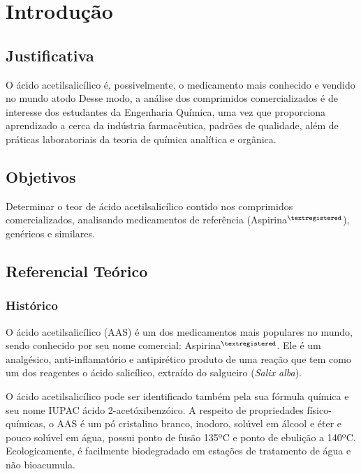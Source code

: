     \chapter{Introdução}\label{intro}
    \section{Justificativa}\label{sub:just}    

    O ácido acetilsalicílico é, possivelmente, o medicamento mais conhecido e vendido no mundo atodo
    Desse modo, a análise dos comprimidos comercializados é de interesse dos estudantes da Engenharia Química,
    uma vez que proporciona aprendizado a cerca da indústria farmacêutica, padrões de qualidade, além de
    práticas laboratoriais da teoria de química analítica e orgânica.

    \section{Objetivos}\label{sub:Objetivos}
    Determinar o teor de ácido acetilsalicílico contido nos comprimidos comercializados, analisando
    medicamentos de referência (Aspirina$^{\tiny{\textregistered}}$), genéricos e similares.

    \section{Referencial Teórico}\label{sub:reft}

    \subsection{Histórico}\label{sub:Histórico}
    
    O ácido acetilsalicílico (AAS) é um dos medicamentos mais populares no mundo, sendo conhecido por seu nome
    comercial: Aspirina$^{\tiny{\textregistered}}$. Ele é um analgésico, anti-inflamatório e antipirético
    produto de uma reação que tem como um dos reagentes o ácido salicílico, extraído do salgueiro (\textit{Salix
    alba}).  

    O ácido acetilsalicílico pode ser identificado também pela sua fórmula química  e seu nome IUPAC
    ácido 2-acetóxibenzóico. A respeito de propriedades físico-químicas, o AAS é um pó cristalino branco,
    inodoro, solúvel em álcool e éter e pouco solúvel em água, possui ponto de fusão 135ºC e ponto de ebulição
    a 140ºC. Ecologicamente, é facilmente biodegradado em estações de tratamento de água e não bioacumula.
    \cite{teves}
    
